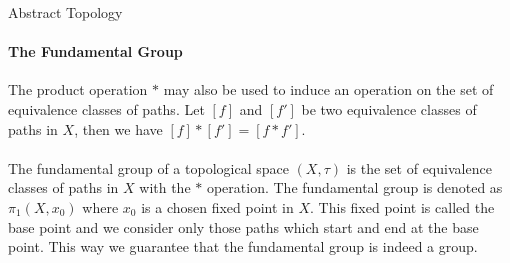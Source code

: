 \documentclass[pdf]{beamer}
\begin{document}
    \begin{frame}{Abstract Topology}
        \framesubtitle{The Fundamental Group}

        The product operation $*$ may also be used to induce an operation on the set of equivalence
        classes of paths. Let $[f]$ and $[f']$ be two equivalence classes of paths in $X$, then
        we have $[f] * [f'] = [f * f']$. \\~\\

        The {\color{red} fundamental group} of a topological space $(X, \tau)$ is the set of equivalence
        classes of paths in $X$ with the $*$ operation. The fundamental group is denoted as $\pi_1(X, x_0)$
        where $x_0$ is a chosen fixed point in $X$. This fixed point is called the {\color{red} base point}
        and we consider only those paths which start and end at the base point. This way we guarantee that the fundamental group is indeed a group. \\~\\
        
    \end{frame}


        
\end{document}

